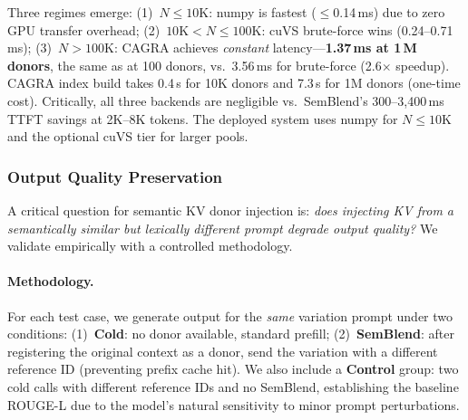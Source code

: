 \documentclass[10pt,twocolumn]{article}
\begin{document}
Three regimes emerge: (1)~$N \leq 10\text{K}$: numpy is fastest
(${\leq}$0.14\,ms) due to zero GPU transfer overhead;
(2)~$10\text{K} < N \leq 100\text{K}$: cuVS brute-force wins
(0.24--0.71\,ms); (3)~$N > 100\text{K}$: CAGRA achieves
\emph{constant} latency---\textbf{1.37\,ms at 1\,M donors}, the
same as at 100 donors, vs.\ 3.56\,ms for brute-force (2.6$\times$
speedup). CAGRA index build takes 0.4\,s for 10K donors and 7.3\,s
for 1M donors (one-time cost). Critically, all three backends are
negligible vs.\ SemBlend's 300--3{,}400\,ms TTFT savings at 2K--8K
tokens. The deployed system uses numpy for $N \leq 10\text{K}$
and the optional cuVS tier for larger pools.

\subsubsection{Output Quality Preservation}
\label{sec:quality}

A critical question for semantic KV donor injection is: \emph{does
injecting KV from a semantically similar but lexically different prompt
degrade output quality?} We validate empirically with a controlled
methodology.

\paragraph{Methodology.}
For each test case, we generate output for the \emph{same} variation
prompt under two conditions: (1)~\textbf{Cold}: no donor available,
standard prefill; (2)~\textbf{SemBlend}: after registering the
original context as a donor, send the variation with a different
reference ID (preventing prefix cache hit). We also include a
\textbf{Control} group: two cold calls with different reference IDs
and no SemBlend, establishing the baseline ROUGE-L due to the
model's natural sensitivity to minor prompt perturbations.
\end{document}
